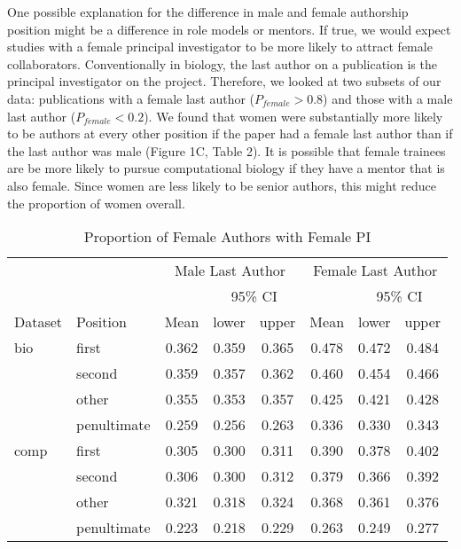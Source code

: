 \documentclass[10pt,letterpaper]{article}
\begin{document}
\begin{flushleft}
One possible explanation for the difference in male and female authorship position might be a difference in role models or mentors. If true, we would expect studies with a female principal investigator to be more likely to attract female collaborators. Conventionally in biology,  the last author on a publication is the principal investigator on the project. Therefore, we looked at two subsets of our data: publications with a female last author ($P_{female} > 0.8$) and those with a male last author ($P_{female} < 0.2$). We found that women were substantially more likely to be authors at every other position if the paper had a female last author than if the last author was male (Figure 1C, Table 2). It is possible that female trainees are be more likely to pursue computational biology if they have a mentor that is also female. Since women are less likely to be senior authors, this might reduce the proportion of women overall.

\begin{table}[]
\centering
\caption{Proportion of Female Authors with Female PI}
\label{Table 2}
\begin{tabular}{llcccccc}
\toprule
        &                 & \multicolumn{3}{c}{Male Last Author} & \multicolumn{3}{c}{Female Last Author} \\
\cmidrule(r){3-8}
        &                 &       & \multicolumn{2}{c}{95\% CI}  &        & \multicolumn{2}{c}{95\% CI}   \\
\cmidrule(r){4-5}\cmidrule(r){7-8}
Dataset & Position        & Mean  & lower        & upper         & Mean   & lower        & upper          \\
\midrule
bio     & first           & 0.362 & 0.359        & 0.365          & 0.478 & 0.472        & 0.484          \\
        & second          & 0.359 & 0.357        & 0.362          & 0.460 & 0.454        & 0.466          \\
        & other           & 0.355 & 0.353        & 0.357          & 0.425 & 0.421        & 0.428          \\
        & penultimate     & 0.259 & 0.256        & 0.263          & 0.336 & 0.330        & 0.343          \\
comp    & first           & 0.305 & 0.300        & 0.311          & 0.390 & 0.378        & 0.402          \\
        & second          & 0.306 & 0.300        & 0.312          & 0.379 & 0.366        & 0.392          \\
        & other           & 0.321 & 0.318        & 0.324          & 0.368 & 0.361        & 0.376          \\
        & penultimate     & 0.223 & 0.218        & 0.229          & 0.263 & 0.249        & 0.277          \\
\bottomrule
\end{tabular}
\end{table}


\end{flushleft}
\end{document}
